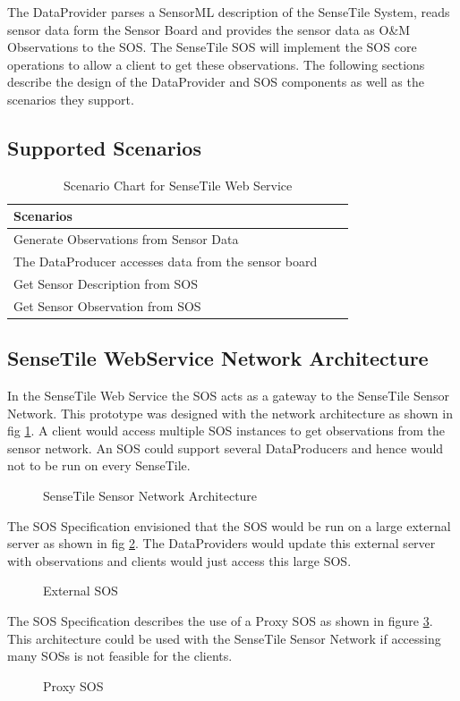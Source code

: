 \documentclass[]{final_report}
\begin{document}
The DataProvider parses a SensorML description of the SenseTile System, reads sensor data form the Sensor Board and provides the sensor data as O\&M Observations to the SOS. The SenseTile SOS will implement the SOS core operations to allow a client to get these observations. The following sections describe the design of the DataProvider and SOS components as well as the scenarios they support.

\subsection{Supported Scenarios}
\begin{table}[!th]
\begin{tabular}{|l|c|r|}
\hline
Scenarios\\
\hline
Generate Observations from Sensor Data \\
The DataProducer accesses data from the sensor board \\
\hline
Get Sensor Description from SOS\\
\hline
Get  Sensor Observation from SOS\\
\hline
\end{tabular}
\caption{Scenario Chart for SenseTile Web Service}
\label{ex:table}
\end{table}
\subsection{SenseTile WebService Network Architecture}
\label{subsec:SenseTile WebService Network Architecture}
In the SenseTile Web Service the SOS acts as a gateway to the SenseTile Sensor Network. This prototype was designed with the network architecture as shown in fig \ref{fig:Deployment_network}. A client would access multiple SOS instances to get observations from the sensor network. An SOS could support several DataProducers and hence would not to be run on every SenseTile. 

\begin{figure}[h]
\caption{SenseTile Sensor Network Architecture}\label{fig:Deployment_network}
\end{figure}
The SOS Specification envisioned that the SOS would be run on a large external server as shown in fig \ref{fig:Deployment_ext_sos}. The DataProviders would update this external server with observations and clients would just access this large SOS.
\begin{figure}[h]
\caption{External SOS}\label{fig:Deployment_ext_sos}
\end{figure}
The SOS Specification describes the use of a Proxy SOS as shown in figure \ref{fig:Deployment_sos_aggr}. This architecture could be used with the SenseTile Sensor Network if accessing many SOSs is not feasible for the clients.
\begin{figure}[h]
\caption{Proxy SOS}\label{fig:Deployment_sos_aggr}
\end{figure}
\end{document}
